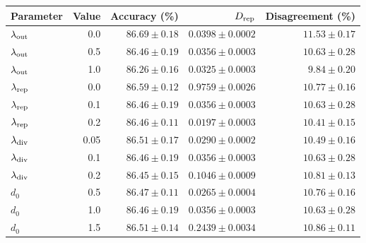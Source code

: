 \begin{tabular}{lrrrr}
\toprule
Parameter & Value & Accuracy (\%) & $D_{\rm rep}$ & Disagreement (\%) \\
\midrule
$\lambda_{\rm out}$ & 0.0 & $86.69\pm0.18$ & $0.0398\pm0.0002$ & $11.53\pm0.17$ \\
$\lambda_{\rm out}$ & 0.5 & $86.46\pm0.19$ & $0.0356\pm0.0003$ & $10.63\pm0.28$ \\
$\lambda_{\rm out}$ & 1.0 & $86.26\pm0.16$ & $0.0325\pm0.0003$ & $9.84\pm0.20$ \\
$\lambda_{\rm rep}$ & 0.0 & $86.59\pm0.12$ & $0.9759\pm0.0026$ & $10.77\pm0.16$ \\
$\lambda_{\rm rep}$ & 0.1 & $86.46\pm0.19$ & $0.0356\pm0.0003$ & $10.63\pm0.28$ \\
$\lambda_{\rm rep}$ & 0.2 & $86.46\pm0.11$ & $0.0197\pm0.0003$ & $10.41\pm0.15$ \\
$\lambda_{\rm div}$ & 0.05 & $86.51\pm0.17$ & $0.0290\pm0.0002$ & $10.49\pm0.16$ \\
$\lambda_{\rm div}$ & 0.1 & $86.46\pm0.19$ & $0.0356\pm0.0003$ & $10.63\pm0.28$ \\
$\lambda_{\rm div}$ & 0.2 & $86.45\pm0.15$ & $0.1046\pm0.0009$ & $10.81\pm0.13$ \\
$d_0$ & 0.5 & $86.47\pm0.11$ & $0.0265\pm0.0004$ & $10.76\pm0.16$ \\
$d_0$ & 1.0 & $86.46\pm0.19$ & $0.0356\pm0.0003$ & $10.63\pm0.28$ \\
$d_0$ & 1.5 & $86.51\pm0.14$ & $0.2439\pm0.0034$ & $10.86\pm0.11$ \\
\bottomrule
\end{tabular}
